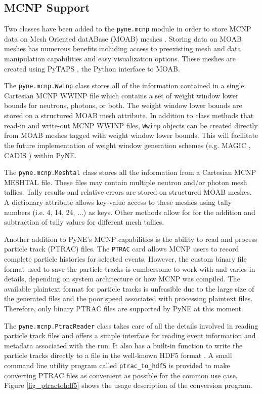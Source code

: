 \documentclass{ansconf}
\begin{document}
\subsection{MCNP Support}

Two classes have been added to the \texttt{pyne.mcnp} module in order to store
MCNP data on Mesh Oriented datABase (MOAB) meshes \cite{tautges_moab:_2004}.
Storing data on MOAB meshes has numerous benefits including access to preexisting
mesh and data manipulation capabilities and easy visualization options. These
meshes are created using PyTAPS \cite{pytaps}, the Python interface to MOAB.

The \texttt{pyne.mcnp.Wwinp} class stores all of the information contained in a
single Cartesian MCNP WWINP file which contains a set of weight window lower
bounds for neutrons, photons, or both. The weight window lower bounds are
stored on a structured MOAB mesh attribute. In addition to class methods that
read-in and write-out MCNP WWINP files, \texttt{Wwinp} objects can be created
directly from MOAB meshes tagged with weight window lower bounds. This will
facilitate the future implementation of weight window generation schemes (e.g.
MAGIC \cite{davis_comparison_2011}, CADIS \cite{haghighat_monte_2003}) within
PyNE.

The \texttt{pyne.mcnp.Meshtal} class stores all the information from a Cartesian
MCNP MESHTAL file. These files may contain multiple neutron and/or photon mesh
tallies.  Tally results and relative errors are stored on structured MOAB
meshes. A dictionary attribute allows key-value access to these meshes using
tally numbers (i.e. 4, 14, 24, ...) as keys. Other methods allow for for the
addition and subtraction of tally values for different mesh tallies.

Another addition to PyNE's MCNP capabilities is the ability to read and
process particle track (PTRAC) files. The \texttt{PTRAC} card allows MCNP
users to record complete particle histories for selected events. However,
the custom binary file format used to save the particle tracks is cumbersome
to work with and varies in details, depending on system architecture or
how MCNP was compiled. The available plaintext format for particle
tracks is unfeasible due to the large size of the generated files and the
poor speed associated with processing plaintext files. Therefore, only
binary PTRAC files are supported by PyNE at this moment.

The \texttt{pyne.mcnp.PtracReader} class takes care of all the details
involved in reading particle track files and offers a simple interface
for reading event information and metadata associated with the run.
It also has a built-in function to write the particle tracks directly
to a file in the well-known HDF5 format \cite{hdf5}.
A small command line utility program called \verb|ptrac_to_hdf5| is
provided to make converting PTRAC files as convenient as possible
for the common use case. Figure \ref{fig_ptractohdf5} shows the usage
description of the conversion program.
\end{document}
